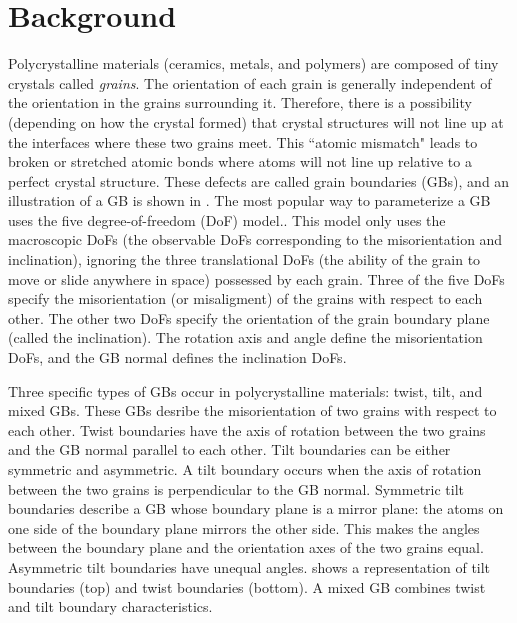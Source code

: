 \documentclass[twoside,senior]{BYUPhys}
\begin{document}
\section{Background\label{intro:background}}
Polycrystalline materials (ceramics, metals, and polymers) are composed of tiny crystals called \emph{grains}.  The orientation of each grain is generally independent of the orientation in the grains surrounding it. Therefore, there is a possibility (depending on how the crystal formed\cite{callister2003}) that crystal structures will not line up at the interfaces where these two grains meet.  This ``atomic mismatch"\cite{callister2003} leads to broken or stretched atomic bonds where atoms will not line up relative to a perfect crystal structure.  These defects are called grain boundaries (GBs), and an illustration of a GB is shown in . The most popular way to parameterize a GB uses the five degree-of-freedom (DoF) model.\cite{patala2013, lejcek2010, homer2015, bulatov2014, harbison2015, rohrer2011}.  This model only uses the macroscopic DoFs (the observable DoFs corresponding to the misorientation and inclination), ignoring the three translational DoFs (the ability of the grain to move or slide anywhere in space) possessed by each grain.  Three of the five DoFs specify the misorientation (or misaligment) of the grains with respect to each other.  The other two DoFs specify the orientation of the grain boundary plane (called the inclination).  The rotation axis and angle define the misorientation DoFs, and the GB normal defines the inclination DoFs.\cite{lejcek2010}

Three specific types of GBs occur in polycrystalline materials: twist, tilt, and mixed GBs.\cite{lejcek2010, rohrer2011}  These GBs desribe the misorientation of two grains with respect to each other.  Twist boundaries have the axis of rotation between the two grains and the GB normal parallel to each other. Tilt boundaries can be either symmetric and asymmetric.  A tilt boundary occurs when the axis of rotation between the two grains is perpendicular to the GB normal.  Symmetric tilt boundaries describe a GB whose boundary plane is a mirror plane: the atoms on one side of the boundary plane mirrors the other side.  This makes the angles between the boundary plane and the orientation axes of the two grains equal. Asymmetric tilt boundaries have unequal angles.   shows a representation of tilt boundaries (top) and twist boundaries (bottom).  A mixed GB combines twist and tilt boundary characteristics.
\end{document}
